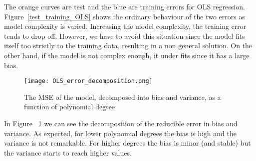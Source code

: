 \documentclass{emulateapj}
\begin{document}
The orange curves are test and the blue are training errors for OLS regression.
Figure~\ref{test_training_OLS}  shows the ordinary behaviour of the two errors as model complexity is varied. Increasing the model complexity, the training error tends to drop off.
However, we have to avoid this situation since the model fits itself too strictly to the training data, resulting in a non general solution.
On the other hand, if the model is not complex enough, it under fits since it has a large bias.
\\
\begin{figure}[H]
\caption{The MSE of the model, decomposed
into bias and variance, as a function of polynomial degree }
\centering
\texttt{[image: OLS\_error\_decomposition.png]}
\label{bias_variance_OLS_true}
\end{figure}
In Figure ~\ref{bias_variance_OLS_true} we can see the decomposition of the reducible error in bias and variance. As expected, for lower polynomial degrees the bias is high and the variance is not remarkable. For higher degrees the bias is minor (and stable) but the variance starts to reach higher values.
\end{document}
